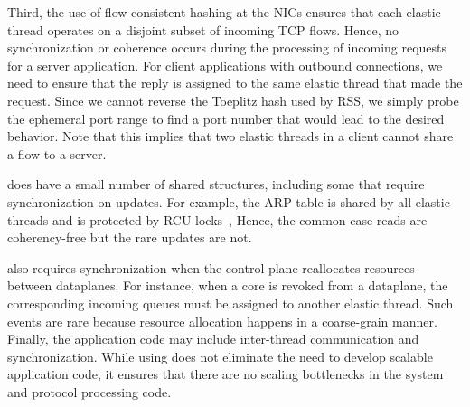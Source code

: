 Third, the use of flow-consistent hashing at the NICs ensures that
each elastic thread operates on a disjoint subset of incoming TCP
flows. Hence, no synchronization or coherence occurs during the
processing of incoming requests for a server application. For client
applications with outbound connections, we need to ensure that the
reply is assigned to the same elastic thread that made the
request. Since we cannot reverse the Toeplitz hash used by RSS, we
simply probe the ephemeral port range to find a port number that
would lead to the desired behavior. Note that this implies that two
elastic threads in a client cannot share a flow to a server. %
 




\ix does have a small number of shared structures, including some that
require synchronization on updates.  For example, the ARP table is
shared by all elastic threads and is protected by RCU
locks~\cite{mckenney1998read}, Hence, the common case reads are
coherency-free but the rare updates are not.
%

\ix also requires
synchronization when the control plane reallocates resources between
dataplanes.  For instance, when a core is revoked from a dataplane,
the corresponding incoming queues must be assigned to another elastic
thread. Such events are rare because resource allocation happens in a
coarse-grain manner. Finally, the application code may include
inter-thread communication and synchronization. While using \ix does
not eliminate the need to develop scalable application code, it
ensures that there are no scaling bottlenecks in the system and
protocol processing code. 

